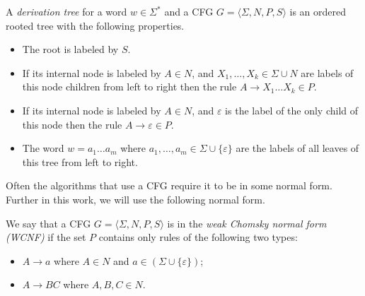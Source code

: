 \begin{definition}
	A \textit{derivation tree} for a word $w \in \Sigma^*$ and a CFG $G=\langle \Sigma, N, P, S \rangle$ is an ordered rooted tree with the following properties.
	\begin{itemize}
		\item The root is labeled by $S$.
		
		\item If its internal node is labeled by $A \in N$, and $X_1, \ldots , X_k \in \Sigma \cup N$ are labels of this node children from left to right then the rule $A \rightarrow X_1 \ldots X_k \in P$.
		
		\item If its internal node is labeled by $A \in N$, and $\varepsilon$ is the label of the only child of this node then the rule $A \rightarrow \varepsilon \in P$.
		
		\item The word $w = a_1 \ldots a_m$ where $a_1, \ldots , a_m \in \Sigma \cup \{\varepsilon\} $ are the labels of all leaves of this tree from left to right.
		
	\end{itemize}
\end{definition}

Often the algorithms that use a CFG require it to be in some normal form. Further in this work, we will use the following normal form.

\begin{definition}
	We say that a CFG $G = \langle \Sigma, N, P, S \rangle$ is in the \textit{weak Chomsky normal form (WCNF)} if the set $P$ contains only rules of the following two types:
	\begin{itemize}
		\item $A \rightarrow a$ where $A \in N$ and $a \in (\Sigma \cup \{\varepsilon\})$;
		\item $A \rightarrow B C$ where $A, B, C \in N$.
	\end{itemize}
\end{definition}

